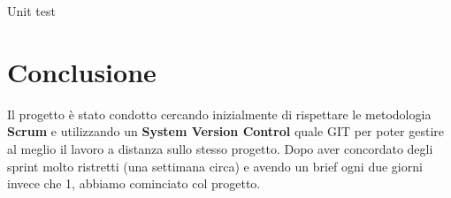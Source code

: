 \documentclass[12pt, a4paper]{article}
\begin{document}
Unit test


\section{Conclusione}
Il progetto è stato condotto cercando inizialmente di rispettare le metodologia \textbf{Scrum} e utilizzando un \textbf{System Version Control} quale GIT per poter gestire al meglio il lavoro a distanza sullo stesso progetto. Dopo aver concordato degli sprint molto ristretti (una settimana circa) e avendo un brief ogni due giorni invece che 1, abbiamo cominciato col progetto.
\end{document}
